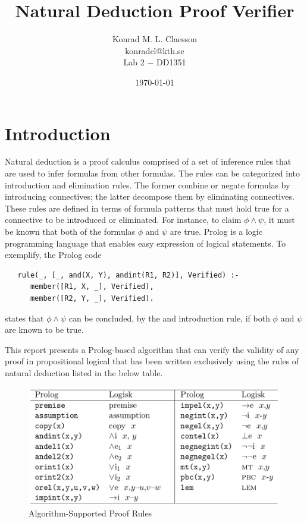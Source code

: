 \documentclass[a4paper, 11pt]{article}
\title{Natural Deduction Proof Verifier}
\author{Konrad M. L. Claesson\\ konradcl@kth.se\\ 
Lab 2 $-$ DD1351}
\date{\today}
\begin{document}
   \maketitle


   \section{Introduction}
   Natural deduction is a proof calculus comprised of a set of
   inference rules that are used to infer formulas from other
   formulas. The rules can be categorized into introduction
   and elimination rules. The former combine or negate
   formulas by introducing connectives; the latter decompose
   them by eliminating connectives. These rules are defined in
   terms of formula patterns that must hold true for a 
   connective to be introduced or eliminated. For instance, to
   claim $\phi \wedge \psi$, it must be known that
   both of the formulas $\phi$ and $\psi$ are true. Prolog is
   a logic programming language that enables easy expression 
   of logical statements. To exemplify, the Prolog code
   
\begin{verbatim}
   rule(_, [_, and(X, Y), andint(R1, R2)], Verified) :-
      member([R1, X, _], Verified),
      member([R2, Y, _], Verified).
\end{verbatim}
   
   states that $\phi \wedge \psi$ can be concluded, by the and
   introduction rule, if both $\phi$ and $\psi$ are known to
   be true. 
   \bigbreak

   This report presents a Prolog-based algorithm that can
   verify the validity of any proof in propositional logical 
   that has been written exclusively using the rules of
   natural deduction listed in the below table.

   \begin{figure}
      \centering
      \includegraphics[scale=0.325]{inference-rules}
      \caption{Algorithm-Supported Proof Rules}
   \end{figure}
\end{document}
